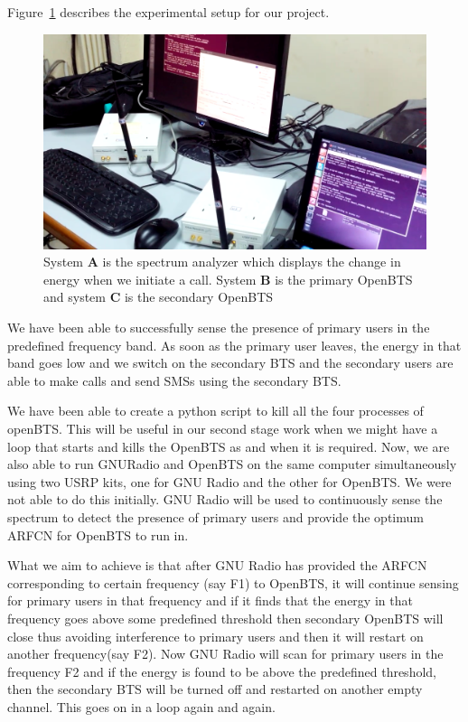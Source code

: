 Figure~\ref{workSetup} describes the experimental setup for our project.

\begin{figure}[H]
\centering
\includegraphics[width=1\textwidth]{workSetup}
\caption[The setup used for the project]{System \textbf{A} is the spectrum analyzer which displays the change in energy when we
initiate a call. System \textbf{B} is the primary OpenBTS and system \textbf{C} is the secondary OpenBTS}
\label{workSetup}
\end{figure}










 
 
We have been able to successfully sense the presence of primary users in the predefined 
frequency band. As soon as the primary user leaves, the energy in that band goes
low and we switch on the secondary BTS and the secondary users are able to make calls and send SMSs using the secondary BTS. 

We have been able to create a python script to kill all the four processes of openBTS. This will be useful in our second stage
work when we might have a loop that starts and kills the OpenBTS as and when it is required. Now, we are also able to run GNURadio and OpenBTS 
on the same computer simultaneously using two USRP kits, one for GNU Radio and the other for OpenBTS. We were not able to do this initially.
GNU Radio will be used to continuously sense the spectrum to detect the presence of primary users and provide the optimum ARFCN for OpenBTS to run in. 

What we aim to achieve is that after GNU Radio has provided the ARFCN corresponding 
to certain frequency (say F1) to OpenBTS, it will continue sensing for primary users in that  
frequency and if it finds that the energy in that
frequency goes above some predefined threshold then secondary OpenBTS will close thus 
avoiding interference to primary users and then it will restart on another frequency(say F2). 
Now GNU Radio will scan for primary users in the frequency F2 and if the energy is found to be above the predefined threshold, then 
the secondary BTS will be turned off and 
restarted on another empty channel. This goes on in a loop again and again.

